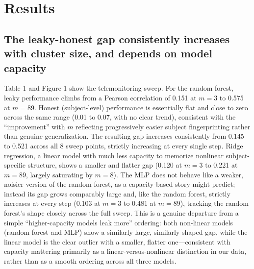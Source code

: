 \documentclass[11pt]{article}
\begin{document}
\section{Results}
\subsection{The leaky-honest gap consistently increases with cluster size, and depends on model capacity}
Table 1 and Figure 1 show the telemonitoring sweep. For the random forest, leaky performance climbs from a Pearson correlation of 0.151 at $m=3$ to 0.575 at $m=89$. Honest (subject-level) performance is essentially flat and close to zero across the same range (0.01 to 0.07, with no clear trend), consistent with the ``improvement'' with $m$ reflecting progressively easier subject fingerprinting rather than genuine generalization. The resulting gap increases consistently from 0.145 to 0.521 across all 8 sweep points, strictly increasing at every single step. Ridge regression, a linear model with much less capacity to memorize nonlinear subject-specific structure, shows a smaller and flatter gap (0.120 at $m=3$ to 0.221 at $m=89$, largely saturating by $m=8$). The MLP does not behave like a weaker, noisier version of the random forest, as a capacity-based story might predict; instead its gap grows comparably large and, like the random forest, strictly increases at every step (0.103 at $m=3$ to 0.481 at $m=89$), tracking the random forest's shape closely across the full sweep. This is a genuine departure from a simple ``higher-capacity models leak more'' ordering: both non-linear models (random forest and MLP) show a similarly large, similarly shaped gap, while the linear model is the clear outlier with a smaller, flatter one---consistent with capacity mattering primarily as a linear-versus-nonlinear distinction in our data, rather than as a smooth ordering across all three models.
\end{document}
